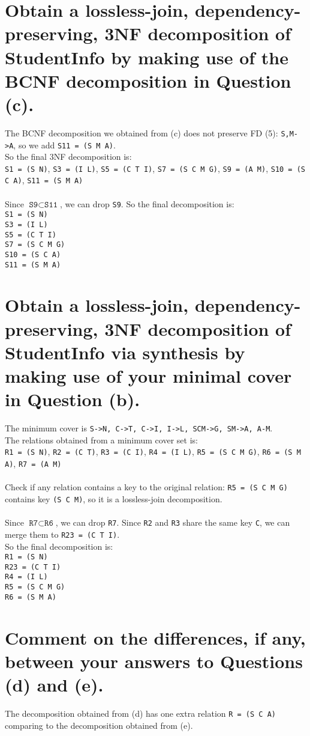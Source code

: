 \documentclass{article}
\begin{document}
\section{Obtain a lossless-join, dependency-preserving, 3NF decomposition of StudentInfo by
making use of the BCNF decomposition in Question (c).}
The BCNF decomposition we obtained from (c) does not preserve FD (5): \texttt{S,M->A}, so we add \texttt{S11 = (S M A)}.\\
So the final 3NF decomposition is: \\
\texttt{S1 = (S N)}, \texttt{S3 = (I L)}, \texttt{S5 = (C T I)}, \texttt{S7 = (S C M G)}, \texttt{S9 = (A M)}, \texttt{S10 = (S C A)}, \texttt{S11 = (S M A)}\\
\\
Since \(\texttt{S9} \subset \texttt{S11}\), we can drop \texttt{S9}.
So the final decomposition is:\\
\texttt{S1 = (S N)} \\
\texttt{S3 = (I L)} \\
\texttt{S5 = (C T I)} \\
\texttt{S7 = (S C M G)} \\
\texttt{S10 = (S C A)}\\
\texttt{S11 = (S M A)}\\


\section{Obtain a lossless-join, dependency-preserving, 3NF decomposition of StudentInfo via
synthesis by making use of your minimal cover in Question (b).}
The minimum cover is \texttt{S->N, C->T, C->I, I->L, SCM->G, SM->A, A-M}.\\
The relations obtained from a minimum cover set is:\\
\texttt{R1 = (S N)}, \texttt{R2 = (C T)}, \texttt{R3 = (C I)}, \texttt{R4 = (I L)}, \texttt{R5 = (S C M G)}, \texttt{R6 = (S M A)}, \texttt{R7 = (A M)}\\
\\
Check if any relation contains a key to the original relation:
\texttt{R5 = (S C M G)} contains key \texttt{(S C M)}, so it is a lossless-join decomposition.\\
\\
Since \( \texttt{R7} \subset \texttt{R6} \), we can drop \texttt{R7}.
Since \texttt{R2} and \texttt{R3} share the same key \texttt{C}, we can merge them to \texttt{R23 = (C T I)}.
\\
So the final decomposition is:\\
\texttt{R1 = (S N)}\\
\texttt{R23 = (C T I)}\\
\texttt{R4 = (I L)}\\
\texttt{R5 = (S C M G)}\\
\texttt{R6 = (S M A)}\\

\section{Comment on the differences, if any, between your answers to Questions (d) and (e).}
The decomposition obtained from (d) has one extra relation \texttt{R = (S C A)} comparing to the decomposition obtained from (e).\\
\end{document}
